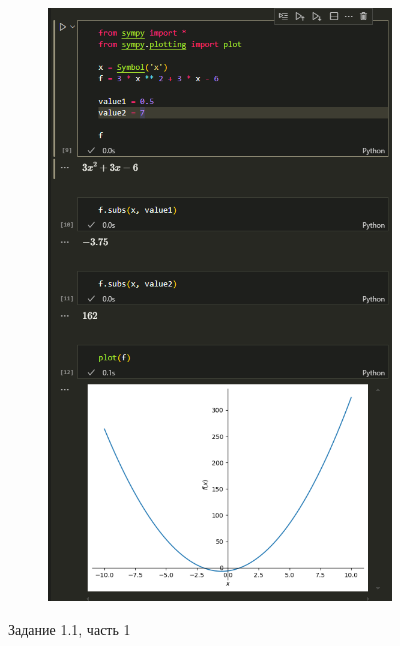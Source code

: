 \documentclass[14pt,a4paper]{extarticle}
\begin{document}
\begin{figure}[h!]
\begin{subfigure}{.5\textwidth}
        \includegraphics[width=0.9\linewidth]{figures/inftech/lab1/1.1 (2).png}
        \label{fig:1.1(2)}
    \end{subfigure}
    \caption{Задание 1.1, часть 1}
    \label{fig:1.1-part1}
\end{figure}
\end{document}
